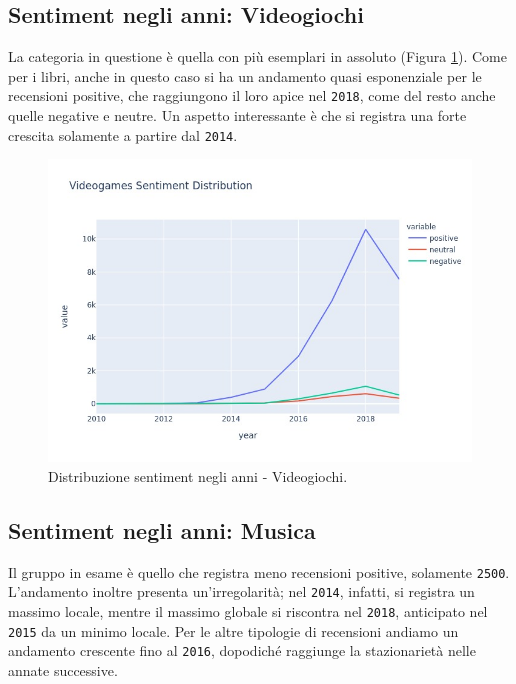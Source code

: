 			\subsection{Sentiment negli anni: Videogiochi}
				La categoria in questione è quella con più esemplari in assoluto (Figura \ref{fig:sent_year_videogames}). Come per i libri, anche in questo caso si ha un andamento quasi esponenziale per le recensioni positive, che raggiungono il loro apice nel \verb|2018|, come del resto anche quelle negative e neutre. Un aspetto interessante è che si registra una forte crescita solamente a partire dal \verb|2014|.
				
			\begin{figure} [h]
				\includegraphics[width=\textwidth]{Figure/sent_year_videogames}
				\caption{Distribuzione sentiment negli anni - Videogiochi.}
				\label{fig:sent_year_videogames}
			\end{figure}
		
		
			\subsection{Sentiment negli anni: Musica}
				Il gruppo in esame è quello che registra meno recensioni positive, solamente \verb|2500|. L'andamento inoltre presenta un'irregolarità; nel \verb|2014|, infatti, si registra un massimo locale, mentre il massimo globale si riscontra nel \verb|2018|, anticipato nel \verb|2015| da un minimo locale. Per le altre tipologie di recensioni andiamo un andamento crescente fino al \verb|2016|, dopodiché raggiunge la stazionarietà nelle annate successive.
				
